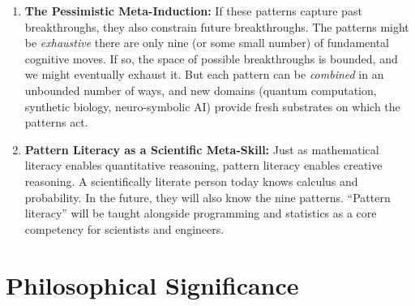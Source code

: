 \begin{enumerate}
\item \textbf{The Pessimistic Meta-Induction:} If these patterns capture past breakthroughs, they also constrain future breakthroughs. The patterns might be \emph{exhaustive} there are only nine (or some small number) of fundamental cognitive moves. If so, the space of possible breakthroughs is bounded, and we might eventually exhaust it. But each pattern can be \emph{combined} in an unbounded number of ways, and new domains (quantum computation, synthetic biology, neuro-symbolic AI) provide fresh substrates on which the patterns act.

\item \textbf{Pattern Literacy as a Scientific Meta-Skill:} Just as mathematical literacy enables quantitative reasoning, pattern literacy enables creative reasoning. A scientifically literate person today knows calculus and probability. In the future, they will also know the nine patterns. ``Pattern literacy'' will be taught alongside programming and statistics as a core competency for scientists and engineers.
\end{enumerate}

\section{Philosophical Significance}
\label{sec:anatomy:philosophy}

